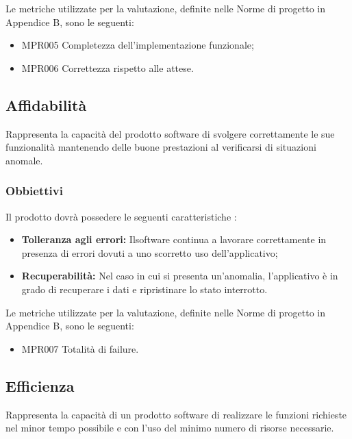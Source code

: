 Le metriche utilizzate per la valutazione, definite nelle Norme di progetto in Appendice B, sono le seguenti:
\begin{itemize}
	\item MPR005 Completezza dell'implementazione funzionale;
	\item MPR006 Correttezza rispetto alle attese.
\end{itemize}

\subsection{Affidabilità}
Rappresenta la capacità del prodotto software di svolgere correttamente le sue funzionalità mantenendo delle buone prestazioni al verificarsi di situazioni anomale.

\subsubsection{Obbiettivi } Il prodotto dovrà possedere le seguenti caratteristiche :
\begin{itemize}
	\item \textbf{Tolleranza agli errori:} Ilsoftware continua a lavorare correttamente in presenza di errori dovuti a uno scorretto uso dell'applicativo;
	\item \textbf{Recuperabilità:} Nel caso in cui si presenta un'anomalia, l'applicativo è in grado di recuperare i dati e ripristinare lo stato interrotto.
\end{itemize}

Le metriche utilizzate per la valutazione, definite nelle Norme di progetto in Appendice B, sono le seguenti:
\begin{itemize}
	\item MPR007 Totalità di failure.
\end{itemize}


\subsection{Efficienza}
Rappresenta la capacità di un prodotto software di realizzare le funzioni richieste nel minor tempo possibile e con l'uso del minimo numero di risorse necessarie. 
